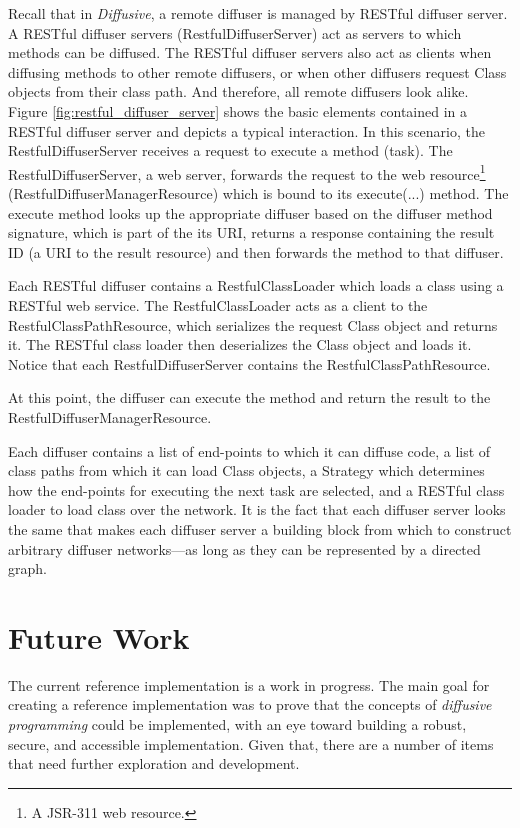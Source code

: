 \documentclass[11pt]{scrartcl}
\begin{document}
Recall that in \emph{Diffusive}, a remote diffuser is managed by RESTful diffuser server. A RESTful diffuser servers (\textsf{RestfulDiffuserServer}) act as servers to which methods can be diffused. The RESTful diffuser servers also act as clients when diffusing methods to other remote diffusers, or when other diffusers request \textsf{Class} objects from their class path. And therefore, all remote diffusers look alike. Figure \ref{fig:restful_diffuser_server} shows the basic elements contained in a RESTful diffuser server and depicts a typical interaction. In this scenario, the \textsf{RestfulDiffuserServer} receives a request to execute a method (task). The \textsf{RestfulDiffuserServer}, a web server, forwards the request to the web resource\footnote{A JSR-311 web resource.} (\textsf{RestfulDiffuserManagerResource}) which is bound to its \textsf{execute(...)} method. The execute method looks up the appropriate diffuser based on the diffuser method signature, which is part of the its URI, returns a response containing the result ID (a URI to the result resource) and then forwards the method to that diffuser. 

Each RESTful diffuser contains a \textsf{RestfulClassLoader} which loads a class using a RESTful web service. The \textsf{RestfulClassLoader} acts as a client to the \textsf{RestfulClassPathResource}, which serializes the request \textsf{Class} object and returns it. The RESTful class loader then deserializes the \textsf{Class} object and loads it. Notice that each \textsf{RestfulDiffuserServer} contains the \textsf{RestfulClassPathResource}.

At this point, the diffuser can execute the method and return the result to the \textsf{Restful\-Diffuser\-Manager\-Resource}.

Each diffuser contains a list of end-points to which it can diffuse code, a list of class paths from which it can load \textsf{Class} objects, a \textsf{Strategy} which determines how the end-points for executing the next task are selected, and a RESTful class loader to load class over the network. It is the fact that each diffuser server looks the same that makes each diffuser server a building block from which to construct arbitrary diffuser networks---as long as they can be represented by a directed graph.

%
%
\section{Future Work\label{sec:future_work}}
The current reference implementation is a work in progress. The main goal for creating a reference implementation was to prove that the concepts of \emph{diffusive programming} could be implemented, with an eye toward building a robust, secure, and accessible implementation. Given that, there are a number of items that need further exploration and development.
\end{document}
